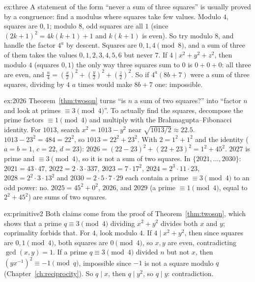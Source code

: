 \begin{solution}{ex:three}
\idea A statement of the form ``never a sum of three squares'' is usually proved by a congruence: find a modulus where squares take few values. Modulo $4$, squares are $0,1$; modulo $8$, odd squares are all $1$ (since $(2k+1)^2=4k(k+1)+1$ and $k(k+1)$ is even). So try modulo $8$, and handle the factor $4^a$ by descent.
\writeup Squares are $0,1,4\pmod8$, and a sum of three of them takes the values $0,1,2,3,4,5,6$ but never $7$. If $4\mid x^2+y^2+z^2$, then modulo $4$ (squares $0,1$) the only way three squares sum to $0$ is $0+0+0$: all three are even, and $\frac n4=\left(\frac x2\right)^2+\left(\frac y2\right)^2+\left(\frac z2\right)^2$. So if $4^a(8b+7)$ were a sum of three squares, dividing by $4$ $a$ times would make $8b+7$ one: impossible.
\end{solution}

\begin{solution}{ex:2026}
\idea Theorem~\ref{thm:twosqn} turns ``is $n$ a sum of two squares?'' into ``factor $n$ and look at primes $\equiv3\pmod4$''. To actually find the squares, decompose the prime factors $\equiv1\pmod4$ and multiply with the Brahmagupta--Fibonacci identity. For $1013$, search $x^2=1013-y^2$ near $\sqrt{1013/2}\approx22.5$.
\writeup $1013-23^2=484=22^2$, so $1013=22^2+23^2$. With $2=1^2+1^2$ and the identity ($a=b=1$, $c=22$, $d=23$): $2026=(22-23)^2+(22+23)^2=1^2+45^2$. $2027$ is prime and $\equiv3\pmod4$, so it is not a sum of two squares. In $\{2021,\dots,2030\}$: $2021=43\cdot47$, $2022=2\cdot3\cdot337$, $2023=7\cdot17^2$, $2024=2^3\cdot11\cdot23$, $2028=2^2\cdot3\cdot13^2$ and $2030=2\cdot5\cdot7\cdot29$ each contain a prime $\equiv3\pmod4$ to an odd power: no. $2025=45^2+0^2$, $2026$, and $2029$ (a prime $\equiv1\pmod4$, equal to $2^2+45^2$) are sums of two squares.
\end{solution}

\begin{solution}{ex:primitive2}
\idea Both claims come from the proof of Theorem~\ref{thm:twosqn}, which shows that a prime $q\equiv3\pmod4$ dividing $x^2+y^2$ divides both $x$ and $y$; coprimality forbids that. For $4$, look modulo $4$.
\writeup If $4\mid x^2+y^2$, then since squares are $0,1\pmod4$, both squares are $0\pmod4$, so $x,y$ are even, contradicting $\gcd(x,y)=1$. If a prime $q\equiv3\pmod4$ divided $n$ but not $x$, then $\left(yx^{-1}\right)^2\equiv-1\pmod q$, impossible since $-1$ is not a square modulo $q$ (Chapter~\ref{ch:reciprocity}). So $q\mid x$, then $q\mid y^2$, so $q\mid y$: contradiction.
\end{solution}

